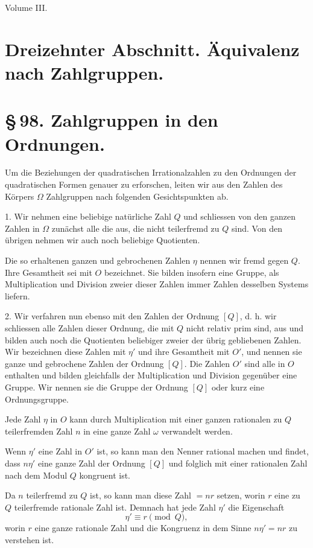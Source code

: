 \documentclass[11pt]{article}
\begin{document}
\begin{center}{\large Volume III.}\end{center}

\section*{Dreizehnter Abschnitt. Äquivalenz nach Zahlgruppen.}

\section*{\S\,98. Zahlgruppen in den Ordnungen.}

Um die Beziehungen der quadratischen Irrationalzahlen zu den Ordnungen der quadratischen Formen genauer zu erforschen, leiten wir aus den Zahlen des Körpers $\Omega$ Zahlgruppen nach folgenden Gesichtspunkten ab.

1. Wir nehmen eine beliebige natürliche Zahl $Q$ und schliessen von den ganzen Zahlen in $\Omega$ zunächst alle die aus, die nicht teilerfremd zu $Q$ sind. Von den übrigen nehmen wir auch noch beliebige Quotienten.

Die so erhaltenen ganzen und gebrochenen Zahlen $\eta$ nennen wir fremd gegen $Q$. Ihre Gesamtheit sei mit $O$ bezeichnet. Sie bilden insofern eine Gruppe, als Multiplication und Division zweier dieser Zahlen immer Zahlen desselben Systems liefern.

2. Wir verfahren nun ebenso mit den Zahlen der Ordnung $[Q]$, d. h. wir schliessen alle Zahlen dieser Ordnung, die mit $Q$ nicht relativ prim sind, aus und bilden auch noch die Quotienten beliebiger zweier der übrig gebliebenen Zahlen. Wir bezeichnen diese Zahlen mit $\eta'$ und ihre Gesamtheit mit $O'$, und nennen sie ganze und gebrochene Zahlen der Ordnung $[Q]$. Die Zahlen $O'$ sind alle in $O$ enthalten und bilden gleichfalls der Multiplication und Division gegenüber eine Gruppe. Wir nennen sie die Gruppe der Ordnung $[Q]$ oder kurz eine Ordnungsgruppe.

Jede Zahl $\eta$ in $O$ kann durch Multiplication mit einer ganzen rationalen zu $Q$ teilerfremden Zahl $n$ in eine ganze Zahl $\omega$ verwandelt werden.

Wenn $\eta'$ eine Zahl in $O'$ ist, so kann man den Nenner rational machen und findet, dass $n\eta'$ eine ganze Zahl der Ordnung $[Q]$ und folglich mit einer rationalen Zahl nach dem Modul $Q$ kongruent ist.

Da $n$ teilerfremd zu $Q$ ist, so kann man diese Zahl $=nr$ setzen, worin $r$ eine zu $Q$ teilerfremde rationale Zahl ist. Demnach hat jede Zahl $\eta'$ die Eigenschaft
\begin{equation}
 \eta'\equiv r\pmod Q,
\tag{1}
\end{equation}
worin $r$ eine ganze rationale Zahl und die Kongruenz in dem Sinne $n\eta'=nr$ zu verstehen ist.
\end{document}

